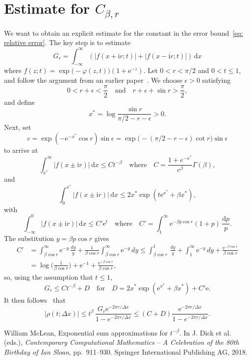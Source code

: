 \documentclass[a4paper,12pt]{article}
\newcommand{\ud}{\mathrm{d}}
\newcommand{\ue}{\mathrm{e}}
\newcommand{\ui}{\mathrm{i}}
\begin{document}
\appendix\section{Estimate for $C_{\beta,r}$}
We want to obtain an explicit estimate for the constant in the error
bound~\eqref{eq: relative error}.  The key step is to estimate
\[
G_r=\int_{-\infty}^\infty(|f(x+\ui r;t)|+|f(x-\ui r;t)|)\,\ud x
\]
where $f(z;t)=\exp\bigl(-\varphi(z,t)\bigr)(1+\ue^{-z})$.  Let $0<r<\pi/2$ and
$0<t\le 1$, and follow the argument from an earlier
paper~\cite[Lemma~1]{McLean2018}.  We choose $\epsilon>0$ satisfying
\[
0<r+\epsilon<\frac{\pi}{2}
\quad\text{and}\quad
r+\epsilon+\sin r>\frac{\pi}{2},
\]
and define
\[
x^*=\log\frac{\sin r}{\pi/2-r-\epsilon}>0.
\]
Next, set
\[
c=\exp(-\ue^{-x^*}\cos r)\sin\epsilon
    =\exp\bigl(-(\pi/2-r-\epsilon)\cot r\bigr)\sin\epsilon
\]
to arrive at
\[
\int_{x^*}^\infty|f(x\pm\ui r)|\,\ud x\le Ct^{-\beta}
\quad\text{where}\quad
C=\frac{1+e^{-x^*}}{c^\beta}\Gamma(\beta),
\]
and
\[
\int_0^{x^*}|f(x\pm\ui r)|\,\ud x
    \le2x^*\exp(t\ue^{x^*}+\beta x^*),
\]
with
\[
\int_{-\infty}^0|f(x\pm\ui r)|\,\ud x\le C'\ue^t
\quad\text{where}\quad
C'=\int_1^\infty \ue^{-\beta p\cos r}(1+p)\,\frac{\ud p}{p}.
\]
The substitution $y=\beta p\cos r$ gives
\begin{align*}
C'&=\int_{\beta\cos r}^\infty\ue^{-y}\,\frac{dy}{y}
    +\frac{1}{\beta\cos r}\int_{\beta\cos r}^\infty\ue^{-y}\,dy
    \le\int_{\beta\cos r}^1\,\frac{dy}{y}+\int_1^\infty\ue^{-y}\,dy
        +\frac{\ue^{-\beta\cos r}}{\beta\cos r}\\
    &=\log\biggl(\frac{1}{\beta\cos r}\biggr)+\ue^{-1}
        +\frac{\ue^{-\beta\cos r}}{\beta\cos r},
\end{align*}
so, using the assumption that $t\le1$,
\[
G_r\le Ct^{-\beta}+D\quad\text{for}\quad D=2x^*\exp(\ue^{x^*}+\beta x^*)+C'\ue.
\]
It then follows~\cite[Theorem~3]{McLean2018} that
\[
|\rho(t;\Delta x)|
    \le t^\beta\,\frac{G_r\ue^{-2\pi r/\Delta x}}{1-e^{-2\pi r/\Delta x}}
    \le(C+D)\frac{\ue^{-2\pi r/\Delta x}}{1-e^{-2\pi r/\Delta x}}.
\]









\begin{thebibliography}{0}
 William McLean, Exponential sum approximations for
$t^{-\beta}$.  In J. Dick et al. (eds.), \emph{ Contemporary Computational
Mathematics – A Celebration of the 80th Birthday of Ian Sloan}, pp.~911--930.
Springer International Publishing AG, 2018.
\end{thebibliography}

\end{document}
